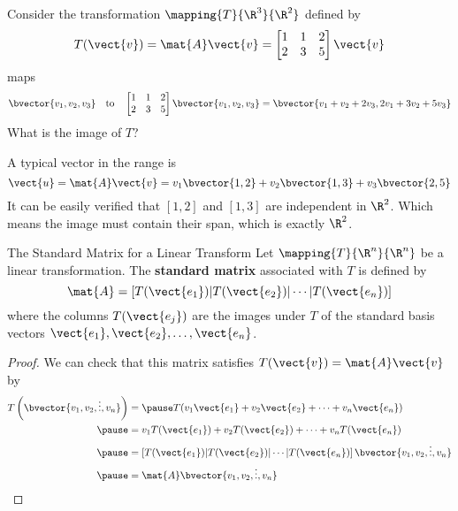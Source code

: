 \documentclass{beamer}
\begin{document}
\begin{frame}
\begin{example}
Consider the transformation $\mapping{T}{\R^3}{\R^2}$ defined by
\begin{equation*}
T(\vect{v})=\mat{A}\vect{v}=
\begin{bmatrix}
1 & 1 & 2 \\
2 & 3 & 5 \\
\end{bmatrix}\vect{v}
\end{equation*}
maps
\begin{equation*}
\bvector{v_1,v_2,v_3}
\quad\text{to}\quad
\begin{bmatrix}
1 & 1 & 2 \\
2 & 3 & 5 \\
\end{bmatrix}
\bvector{v_1,v_2,v_3}=
\bvector{v_1+v_2+2v_3, 2v_1+3v_2+5v_3}
\end{equation*}\pause
What is the image of $T$?\pause

\vspace{2mm}
A typical vector in the range is
\begin{equation*}
\vect{u}=\mat{A}\vect{v}=v_1\bvector{1,2}+v_2\bvector{1,3}+v_3\bvector{2,5}
\end{equation*}\pause
It can be easily verified that $[1,2]$ and $[1,3]$ are independent in $\R^2$. Which means the image must contain their span, which is exactly $\R^2$.
\end{example}
\end{frame}

\begin{frame}
\begin{block}{The Standard Matrix for a Linear Transform}
Let $\mapping{T}{\R^n}{\R^n}$ be a linear transformation. The \textbf{standard matrix} associated with $T$ is defined by
\begin{equation*}
\mat{A}=\left[T(\vect{e_1})|T(\vect{e_2})|\cdots|T(\vect{e_n})\right]
\end{equation*}
where the columns $T(\vect{e_j})$ are the images under $T$ of the standard basis vectors $\vect{e_1}, \vect{e_2},\ldots,\vect{e_n}$.
\end{block}
\end{frame}

\begin{frame}
\begin{proof}
We can check that this matrix satisfies $T(\vect{v})=\mat{A}\vect{v}$ by
\begin{equation*}
\begin{aligned}
T\left(\bvector{v_1,v_2,\vdots,v_n}\right)&=\pause
T(v_1 \vect{e_1} + v_2 \vect{e_2} + \cdots + v_n \vect{e_n})\\\pause
&= v_1 T(\vect{e_1}) + v_2 T(\vect{e_2}) + \cdots + v_n T(\vect{e_n})\\\pause
&= \left[T(\vect{e_1})|T(\vect{e_2})|\cdots|T(\vect{e_n})\right]\bvector{v_1,v_2,\vdots,v_n}\\\pause
&=\mat{A}\bvector{v_1,v_2,\vdots,v_n}
\end{aligned}
\end{equation*}
\end{proof}
\end{frame}
\end{document}
